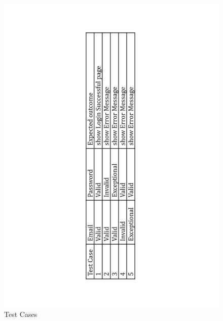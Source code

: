 \documentclass[english]{article}
\begin{document}
\begin{figure}[H]
\centering
\includegraphics[width=1.0\textwidth]{2.2}
\caption{Test Cases}
\end{figure}
\end{document}
